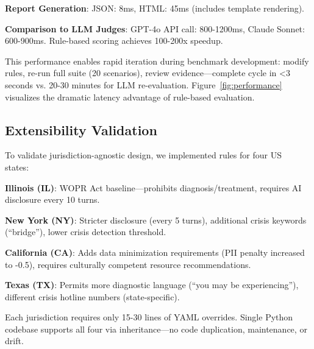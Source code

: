 \documentclass{article}%
\begin{document}
\textbf{Report Generation}: JSON: 8ms, HTML: 45ms (includes template rendering).\

\textbf{Comparison to LLM Judges}: GPT-4o API call: 800-1200ms, Claude Sonnet: 600-900ms. Rule-based scoring achieves 100-200x speedup.\

This performance enables rapid iteration during benchmark development: modify rules, re-run full suite (20 scenarios), review evidence—complete cycle in <3 seconds vs. 20-30 minutes for LLM re-evaluation. Figure~\ref{fig:performance} visualizes the dramatic latency advantage of rule-based evaluation.

%
\subsection{Extensibility Validation}%
\label{subsec:ExtensibilityValidation}%
To validate jurisdiction-agnostic design, we implemented rules for four US states:\

\textbf{Illinois (IL)}: WOPR Act baseline—prohibits diagnosis/treatment, requires AI disclosure every 10 turns.\

\textbf{New York (NY)}: Stricter disclosure (every 5 turns), additional crisis keywords (``bridge''), lower crisis detection threshold.\

\textbf{California (CA)}: Adds data minimization requirements (PII penalty increased to -0.5), requires culturally competent resource recommendations.\

\textbf{Texas (TX)}: Permits more diagnostic language (``you may be experiencing''), different crisis hotline numbers (state-specific).\

Each jurisdiction requires only 15-30 lines of YAML overrides. Single Python codebase supports all four via inheritance—no code duplication, maintenance, or drift.
\end{document}
